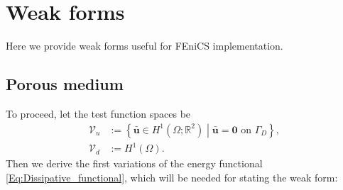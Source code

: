 \section{Weak forms }\label{sub:weak_form}
Here we provide weak forms useful for FEniCS implementation.

\subsection{Porous medium} \label{sub:weak_porous}
To proceed, let the test function spaces be
\begin{equation*}
    \begin{aligned}
        \mathscr{V}_u &:= \left\{\bar{\bm{u}}\in H^1\left(\Omega; \mathbb{R}^2\right) \middle|
        \bar{\bm{u}} = \mathbf{0} \text{ on } \Gamma_D
        \right\},\\
        \mathscr{V}_d &:= H^1(\Omega).
    \end{aligned}
\end{equation*}
Then we derive the first variations of the energy functional \eqref{Eq:Dissipative_functional}, which will be needed for stating the weak form:
